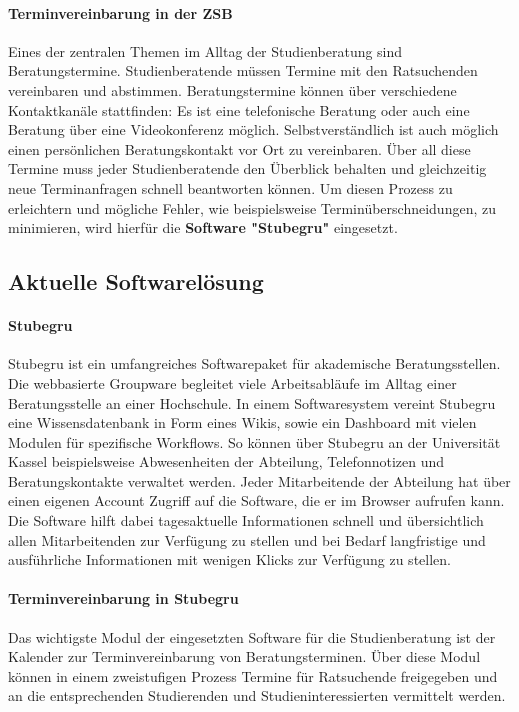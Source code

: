 \paragraph{Terminvereinbarung in der ZSB}
Eines der zentralen Themen im Alltag der Studienberatung sind Beratungstermine.
 Studienberatende müssen Termine mit den Ratsuchenden
vereinbaren und abstimmen. Beratungstermine können über verschiedene
Kontaktkanäle stattfinden: Es ist eine telefonische Beratung oder auch eine
Beratung über eine Videokonferenz möglich. Selbstverständlich ist auch möglich
einen persönlichen Beratungskontakt vor Ort zu vereinbaren. Über all diese
Termine muss jeder Studienberatende den Überblick behalten und gleichzeitig
neue Terminanfragen schnell beantworten können. Um diesen Prozess zu
erleichtern und mögliche Fehler, wie beispielsweise Terminüberschneidungen, zu
minimieren, wird hierfür die \textbf{Software "Stubegru"} eingesetzt.

\subsection{Aktuelle Softwarelösung}
\paragraph{Stubegru}
Stubegru ist ein umfangreiches Softwarepaket für akademische Beratungsstellen.
Die webbasierte Groupware begleitet viele Arbeitsabläufe im Alltag einer
Beratungsstelle an einer Hochschule. In einem Softwaresystem vereint Stubegru
eine Wissensdatenbank in Form eines Wikis, sowie ein Dashboard mit vielen
Modulen für spezifische Workflows. So können über Stubegru an der Universität
Kassel beispielsweise Abwesenheiten der Abteilung, Telefonnotizen und
Beratungskontakte verwaltet werden. Jeder Mitarbeitende der Abteilung hat über
einen eigenen Account Zugriff auf die Software, die er im Browser aufrufen
kann. Die Software hilft dabei tagesaktuelle Informationen schnell und
übersichtlich allen Mitarbeitenden zur Verfügung zu stellen und bei Bedarf
langfristige und ausführliche Informationen mit wenigen Klicks zur Verfügung zu
stellen.\cite{stubegruWebsite}

\paragraph{Terminvereinbarung in Stubegru}
Das wichtigste Modul der eingesetzten Software für die Studienberatung ist der
Kalender zur Terminvereinbarung von Beratungsterminen. Über diese Modul können
in einem zweistufigen Prozess Termine für Ratsuchende freigegeben und an die
entsprechenden Studierenden und Studieninteressierten vermittelt werden.

